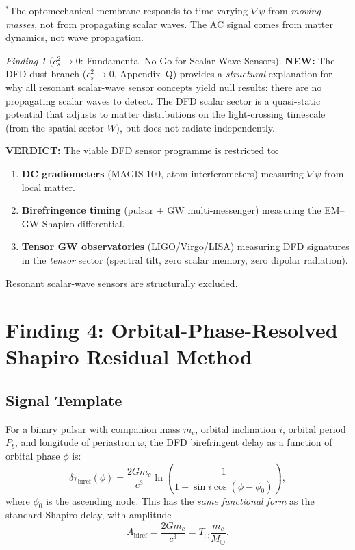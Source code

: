 \documentclass[11pt]{article}
\theoremstyle{definition}
\theoremstyle{remark}
\newtheorem{finding}[theorem]{Finding}
\newcommand{\Msun}{M_\odot}
\newcommand{\newresult}[1]{\textcolor{green!50!black}{\textbf{NEW:} #1}}
\newcommand{\verdict}[1]{\textcolor{green!50!black}{\textbf{VERDICT:} #1}}
\begin{document}
$^*$The optomechanical membrane responds to time-varying
$\nabla\psi$ from \emph{moving masses}, not from propagating scalar
waves. The AC signal comes from matter dynamics, not wave
propagation.

\begin{finding}[$c_s^2 \to 0$: Fundamental No-Go for Scalar Wave
  Sensors]
\label{find:nogo}
\newresult{The DFD dust branch ($c_s^2 \to 0$, Appendix~Q) provides
a \emph{structural} explanation for why all resonant scalar-wave
sensor concepts yield null results: there are no propagating scalar
waves to detect. The DFD scalar sector is a quasi-static potential
that adjusts to matter distributions on the light-crossing timescale
(from the spatial sector $W$), but does not radiate independently.}

\verdict{The viable DFD sensor programme is restricted to:
\begin{enumerate}[nosep]
\item \textbf{DC gradiometers} (MAGIS-100, atom interferometers)
  measuring $\nabla\psi$ from local matter.
\item \textbf{Birefringence timing} (pulsar + GW multi-messenger)
  measuring the EM--GW Shapiro differential.
\item \textbf{Tensor GW observatories} (LIGO/Virgo/LISA) measuring
  DFD signatures in the \emph{tensor} sector (spectral tilt,
  zero scalar memory, zero dipolar radiation).
\end{enumerate}
Resonant scalar-wave sensors are structurally excluded.}
\end{finding}


\section{Finding 4: Orbital-Phase-Resolved Shapiro Residual Method}
\label{sec:shapiro-method}

\subsection{Signal Template}

For a binary pulsar with companion mass $m_c$, orbital inclination
$i$, orbital period $P_b$, and longitude of periastron $\omega$, the
DFD birefringent delay as a function of orbital phase $\phi$ is:
\begin{equation}
\delta\tau_{\mathrm{biref}}(\phi) = \frac{2Gm_c}{c^3}
\ln\left(\frac{1}{1 - \sin i \cos(\phi - \phi_0)}\right),
\label{eq:template}
\end{equation}
where $\phi_0$ is the ascending node. This has the \emph{same
functional form} as the standard Shapiro delay, with amplitude
\begin{equation}
A_{\mathrm{biref}} = \frac{2Gm_c}{c^3} = T_\odot \frac{m_c}{\Msun}.
\end{equation}
\end{document}
